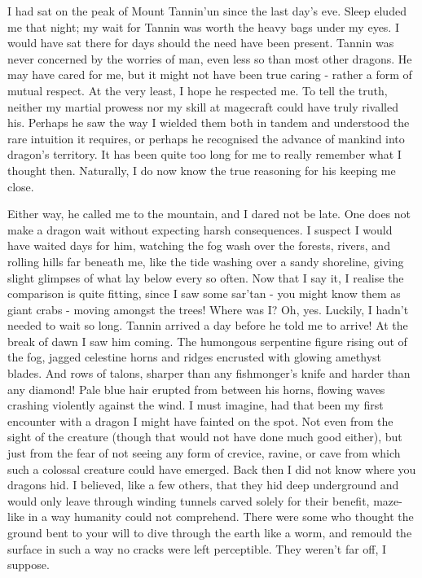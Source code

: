 I had sat on the peak of Mount Tannin'un since the last day's eve. Sleep eluded me that night; my wait for Tannin was worth the heavy bags under my eyes. I would have sat there for days should the need have been present. Tannin was never concerned by the worries of man, even less so than most other dragons. He may have cared for me, but it might not have been true caring - rather a form of mutual respect. At the very least, I hope he respected me. To tell the truth, neither my martial prowess nor my skill at magecraft could have truly rivalled his. Perhaps he saw the way I wielded them both in tandem and understood the rare intuition it requires, or perhaps he recognised the advance of mankind into dragon's territory. It has been quite too long for me to really remember what I thought then. Naturally, I do now know the true reasoning for his keeping me close.

Either way, he called me to the mountain, and I dared not be late. One does not make a dragon wait without expecting harsh consequences. I suspect I would have waited days for him, watching the fog wash over the forests, rivers, and rolling hills far beneath me, like the tide washing over a sandy shoreline, giving slight glimpses of what lay below every so often. Now that I say it, I realise the comparison is quite fitting, since I saw some sar'tan - you might know them as giant crabs - moving amongst the trees! Where was I? Oh, yes. Luckily, I hadn't needed to wait so long. Tannin arrived a day before he told me to arrive! At the break of dawn I saw him coming. The humongous serpentine figure rising out of the fog, jagged celestine horns and ridges encrusted with glowing amethyst blades. And rows of talons, sharper than any fishmonger's knife and harder than any diamond! Pale blue hair erupted from between his horns, flowing waves crashing violently against the wind. I must imagine, had that been my first encounter with a dragon I might have fainted on the spot. Not even from the sight of the creature (though that would not have done much good either), but just from the fear of not seeing any form of crevice, ravine, or cave from which such a colossal creature could have emerged. Back then I did not know where you dragons hid. I believed, like a few others, that they hid deep underground and would only leave through winding tunnels carved solely for their benefit, maze-like in a way humanity could not comprehend. There were some who thought the ground bent to your will to dive through the earth like a worm, and remould the surface in such a way no cracks were left perceptible. They weren't far off, I suppose.

